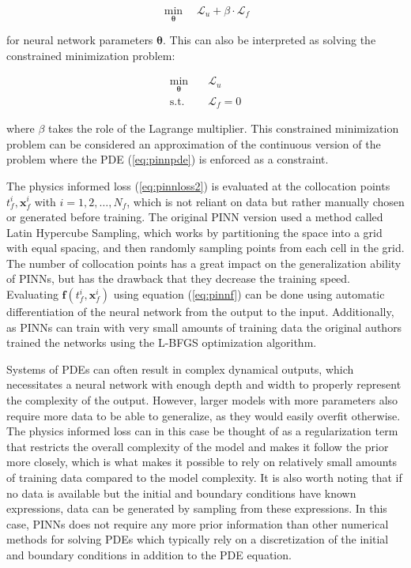 \begin{equation}
    \min_{\bm{\theta}} \quad \mathcal{L}_u + \beta \cdot \mathcal{L}_f
\end{equation}

\noindent for neural network parameters $\bm{\theta}$. This can also be interpreted as solving the constrained minimization problem:

\begin{equation}
    \begin{aligned}
        \min_{\bm{\theta}} \quad & \mathcal{L}_u  \\
        \textrm{s.t.} \quad & \mathcal{L}_f = 0
    \end{aligned}
\end{equation}

\noindent where $\beta$ takes the role of the Lagrange multiplier. This constrained minimization problem can be considered an approximation of the continuous version of the problem where the PDE (\ref{eq:pinnpde}) is enforced as a constraint.

The physics informed loss (\ref{eq:pinnloss2}) is evaluated at the collocation points $t_f^i, \bm{x}_f^i$ with $i = 1, 2, \dots, N_f$, which is not reliant on data but rather manually chosen or generated before training. The original PINN version \cite{pinn1} used a method called Latin Hypercube Sampling, which works by partitioning the space into a grid with equal spacing, and then randomly sampling points from each cell in the grid. The number of collocation points has a great impact on the generalization ability of PINNs, but has the drawback that they decrease the training speed. Evaluating $\bm{f}(t_f^i, \bm{x}_f^i)$ using equation (\ref{eq:pinnf}) can be done using automatic differentiation of the neural network from the output to the input. Additionally, as PINNs can train with very small amounts of training data the original authors trained the networks using the L-BFGS optimization algorithm.

Systems of PDEs can often result in complex dynamical outputs, which necessitates a neural network with enough depth and width to properly represent the complexity of the output. However, larger models with more parameters also require more data to be able to generalize, as they would easily overfit otherwise. The physics informed loss can in this case be thought of as a regularization term that restricts the overall complexity of the model and makes it follow the prior more closely, which is what makes it possible to rely on relatively small amounts of training data compared to the model complexity. It is also worth noting that if no data is available but the initial and boundary conditions have known expressions, data can be generated by sampling from these expressions. In this case, PINNs does not require any more prior information than other numerical methods for solving PDEs which typically rely on a discretization of the initial and boundary conditions in addition to the PDE equation.

